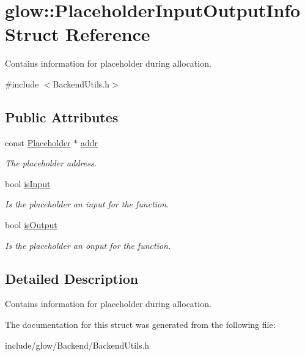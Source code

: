 \hypertarget{structglow_1_1_placeholder_input_output_info}{}\section{glow\+:\+:Placeholder\+Input\+Output\+Info Struct Reference}
\label{structglow_1_1_placeholder_input_output_info}


Contains information for placeholder during allocation.  




{\ttfamily \#include $<$Backend\+Utils.\+h$>$}

\subsection*{Public Attributes}
\begin{DoxyCompactItemize}
\item 
\mbox{\label{structglow_1_1_placeholder_input_output_info_a9ac5a4ca4fb9e3e7a7bd32dc1f5a2678}} 
const \hyperlink{classglow_1_1_placeholder}{Placeholder} $\ast$ \hyperlink{structglow_1_1_placeholder_input_output_info_a9ac5a4ca4fb9e3e7a7bd32dc1f5a2678}{addr}
\begin{DoxyCompactList}\small\item\em The placeholder address. \end{DoxyCompactList}\item 
\mbox{\label{structglow_1_1_placeholder_input_output_info_aa6e84cc79380b0566079c7ddba82521e}} 
bool \hyperlink{structglow_1_1_placeholder_input_output_info_aa6e84cc79380b0566079c7ddba82521e}{is\+Input}
\begin{DoxyCompactList}\small\item\em Is the placeholder an input for the function. \end{DoxyCompactList}\item 
\mbox{\label{structglow_1_1_placeholder_input_output_info_a417e4f232d75672485a8a0179612cf4f}} 
bool \hyperlink{structglow_1_1_placeholder_input_output_info_a417e4f232d75672485a8a0179612cf4f}{is\+Output}
\begin{DoxyCompactList}\small\item\em Is the placeholder an onput for the function. \end{DoxyCompactList}\end{DoxyCompactItemize}


\subsection{Detailed Description}
Contains information for placeholder during allocation. 

The documentation for this struct was generated from the following file\+:\begin{DoxyCompactItemize}
\item 
include/glow/\+Backend/Backend\+Utils.\+h\end{DoxyCompactItemize}

